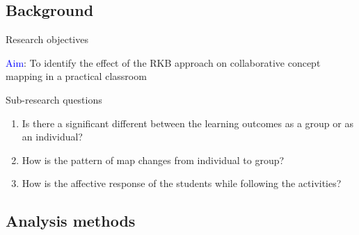 \subsection{Background}
\begin{frame}{Research objectives}

\textcolor{blue}{Aim}:
    To identify the effect of the RKB approach on collaborative concept mapping in a practical classroom


\begin{block}{Sub-research questions}
    \begin{enumerate}
        \item <1-> Is there a significant different between the learning outcomes as a group
        or as an individual?
        \item <2-> How is the pattern of map changes from individual to group?
        \item <3-> How is the affective response of the students while following the activities?
\end{enumerate}
\end{block}

\end{frame}

\subsection{Analysis methods}

